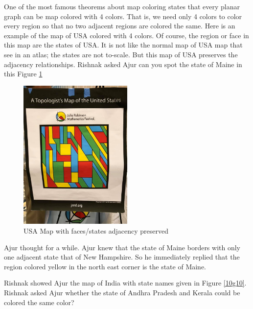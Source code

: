 One of the most famous theorems about map coloring states that every planar graph can be map colored with 4 colors. That is, we need only 4 colors to color every region so that no two adjacent regions are colored the same. Here is an example of the map of USA colored with 4 colors. Of course, the region or face in this map are the states of USA. It is not like the normal map of USA map that see in an atlas; the states are not to-scale. But this map of USA preserves the adjacency relationships. Rishnak asked Ajur can you spot the state of Maine in this Figure \ref{10g9}
\begin{figure}
\begin{center}
\includegraphics[width=0.5\textwidth]{usamap.png}
\end{center}
\caption{USA Map with faces/states adjacency preserved}\label{10g9}
\end{figure}

Ajur thought for a while. Ajur knew that the state of Maine borders with only one adjacent state that of New Hampshire. So he immediately replied that the region colored yellow in the north east corner is the state of Maine.

Rishnak showed Ajur the map of India with state names given in Figure \ref{10g10}. Rishnak asked Ajur whether the state of Andhra Pradesh and Kerala could be colored the same color?

